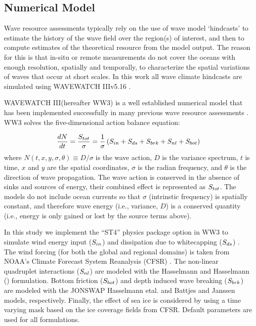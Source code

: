 \subsection{Numerical Model} \label{sec:method:model}

Wave resource assessments typically rely on the use of wave model `hindcasts' to estimate the history of the wave field over the region(s) of interest, and then to compute estimates of the theoretical resource from the model output. The reason for this is that in-situ or remote measurements do not cover the oceans with enough resolution, spatially and temporally, to characterize the spatial variations of waves that occur at short scales. 
In this work all wave climate hindcasts are simulated using WAVEWATCH III\textregistered v5.16 \citep{tolmanDistributedmemoryConceptsWave2002,tolmanwavewatch}.

WAVEWATCH III\textregistered (hereafter WW3) is a  well established numerical model that has been implemented successfully in many previous wave resource assessments \citep[e.g.,][]{garcia-medinaWaveResourceAssessment2014,hemerRevisedAssessmentAustralia2017,yangWaveModelTest2017}.
WW3 solves the five-dimensional action balance equation:

\begin{align}
  \frac{d N}{d t} = \frac{S_{ tot }}{\sigma} = \frac{1}{\sigma}\left ( S_{ in } + S_{ ds } + S_{ brk } + S_{ nl } + S_{ bot } \right )
  \label{eqn:actionbalance}
\end{align}
where $N(t,x,y,\sigma,\theta) \equiv D/\sigma$ is the wave action, $D$ is the variance spectrum, $t$ is time, $x$ and $y$ are the spatial coordinates, $\sigma$ is the radian frequency, and $\theta$ is the direction of wave propagation.
The wave action is conserved in the absence of sinks and sources of energy, their combined effect is represented as $S_{ tot }$.
The models do not include ocean currents so that $\sigma$ (intrinstic frequency) is spatially constant, and therefore wave energy (i.e., variance, $D$) is a conserved quantity (i.e., energy is only gained or lost by the source terms above).

In this study we implement the ``ST4'' physics package option in WW3 to simulate wind energy input ($S_{ in }$) and dissipation due to whitecapping ($S_{ ds }$) \citep{ardhuinObservationSwellDissipation2009}.
The wind forcing (for both the global and regional domains) is taken from NOAA's Climate Forecast System Reanalysis (CFSR) \citep{sahaNCEPClimateForecast2010}. The non-linear quadruplet interactions ($S_{ nl }$) are modeled with the Hasselmann and Hasselmann (\citeyear{hasselmannComputationsParameterizationsNonlinear1985}) formulation. Bottom friction ($S_{ bot }$) and depth induced wave breaking ($S_{ brk }$) are modeled with the JONSWAP Hasselmann etal. \citeyear{hasselmannMeasurementsWindwaveGrowth1973} and Battjes and Janssen \citeyear{battjesEnergyLossSetup1978} models, respectively. Finally, the effect of sea ice is considered by using a time varying mask based on the ice coverage fields from CFSR. Default parameters are used for all formulations.

